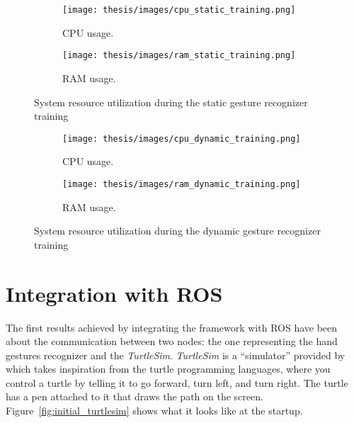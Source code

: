 \documentclass[../thesis.tex]{subfiles}
\begin{document}
\begin{figure}[H]
    \centering
    \begin{subfigure}[b]{0.45\textwidth}
        \centering
        \texttt{[image: thesis/images/cpu\_static\_training.png]}
        \caption{CPU usage.}
        \label{fig:cpu_usage_static_training}
    \end{subfigure}
    \hfill
    \begin{subfigure}[b]{0.45\textwidth}
        \centering
        \texttt{[image: thesis/images/ram\_static\_training.png]}
        \caption{RAM usage.}
        \label{fig:ram_usage_static_training}
    \end{subfigure}
    \caption{System resource utilization during the static gesture recognizer training}
    \label{fig:system_resource_graphs_static_training}
\end{figure}

\begin{figure}[H]
    \centering
    \begin{subfigure}[b]{0.45\textwidth}
        \centering
        \texttt{[image: thesis/images/cpu\_dynamic\_training.png]}
        \caption{CPU usage.}
        \label{fig:cpu_usage_dynamic_training}
    \end{subfigure}
    \hfill
    \begin{subfigure}[b]{0.45\textwidth}
        \centering
        \texttt{[image: thesis/images/ram\_dynamic\_training.png]}
        \caption{RAM usage.}
        \label{fig:ram_usage_dynamic_training}
    \end{subfigure}
    \caption{System resource utilization during the dynamic gesture recognizer training}
    \label{fig:system_resource_graphs_dynamic_training}
\end{figure}

\section{Integration with ROS}
The first results achieved by integrating the framework with \gls{ROS} have been about the communication between two nodes: the one representing the hand gestures recognizer and the \textit{TurtleSim}. \textit{TurtleSim} is a ``simulator'' provided by  which takes inspiration from the turtle programming languages, where you control a turtle by telling it to go forward, turn left, and turn right. The turtle has a pen attached to it that draws the path on the screen. Figure~\ref{fig:initial_turtlesim} shows what it looks like at the startup.
\end{document}
